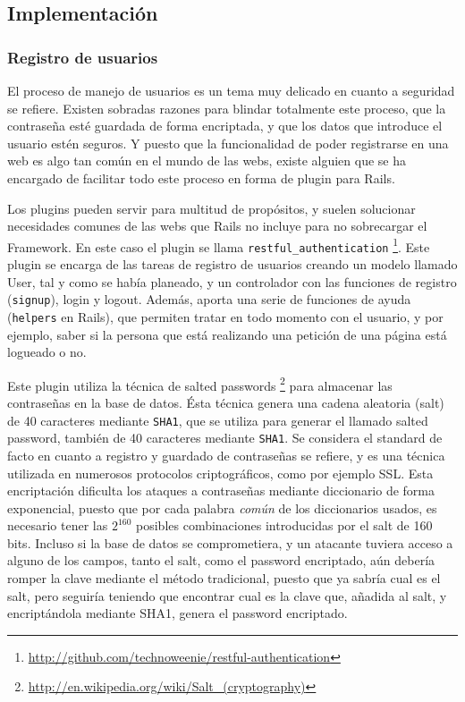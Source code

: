 
\subsection{Implementación} %
\label{sub:implementación}

\subsubsection{Registro de usuarios} %
\label{ssub:registro_de_usuarios}

El proceso de manejo de usuarios es un tema muy delicado en cuanto a seguridad se refiere. Existen sobradas razones para blindar totalmente este proceso, que la contraseña esté guardada de forma encriptada, y que los datos que introduce el usuario estén seguros. Y puesto que la funcionalidad de poder registrarse en una web es algo tan común en el mundo de las webs, existe alguien que se ha encargado de facilitar todo este proceso en forma de plugin para Rails.

Los plugins pueden servir para multitud de propósitos, y suelen solucionar necesidades comunes de las webs que Rails no incluye para no sobrecargar el Framework. En este caso el plugin se llama \texttt{restful\_authentication} \footnote{\url{http://github.com/technoweenie/restful-authentication}}. Este plugin se encarga de las tareas de registro de usuarios creando un modelo llamado User, tal y como se había planeado, y un controlador con las funciones de registro (\texttt{signup}), login y logout. Además, aporta una serie de funciones de ayuda (\texttt{helpers} en Rails), que permiten tratar en todo momento con el usuario, y por ejemplo, saber si la persona que está realizando una petición de una página está logueado o no. 

Este plugin utiliza la técnica de salted passwords \footnote{\url{http://en.wikipedia.org/wiki/Salt\_(cryptography)}} para almacenar las contraseñas en la base de datos. Ésta técnica genera una cadena aleatoria (salt) de 40 caracteres mediante \texttt{SHA1}, que se utiliza para generar el llamado salted password, también de 40 caracteres mediante \texttt{SHA1}. Se considera el standard de facto en cuanto a registro y guardado de contraseñas se refiere, y es una técnica utilizada en numerosos protocolos criptográficos, como por ejemplo SSL. Esta encriptación dificulta los ataques a contraseñas mediante diccionario de forma exponencial, puesto que por cada palabra \emph{común} de los diccionarios usados, es necesario tener las $2^{160}$ posibles combinaciones introducidas por el salt de 160 bits. Incluso si la base de datos se comprometiera, y un atacante tuviera acceso a alguno de los campos, tanto el salt, como el password encriptado, aún debería romper la clave mediante el método tradicional, puesto que ya sabría cual es el salt, pero seguiría teniendo que encontrar cual es la clave que, añadida al salt, y encriptándola mediante SHA1, genera el password encriptado.

